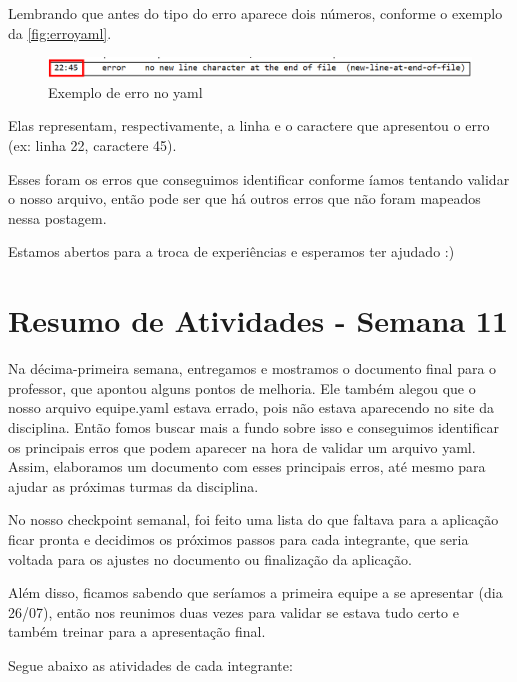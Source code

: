 \begin{apendicesenv}
Lembrando que antes do tipo do erro aparece dois números, conforme o exemplo da \autoref{fig:erroyaml}.

\begin{figure}[htb]
    \centering
	\includegraphics[width=16cm]{imagens/erroyaml.png}
	\caption{\label{fig:erroyaml} Exemplo de erro no yaml}
\end{figure}
\FloatBarrier

Elas representam, respectivamente, a linha e o caractere que apresentou o erro (ex: linha 22, caractere 45).


Esses foram os erros que conseguimos identificar conforme íamos tentando validar o nosso arquivo, então pode ser que há outros erros que não foram mapeados nessa postagem. 

Estamos abertos para a troca de experiências e esperamos ter ajudado :)

\section{Resumo de Atividades - Semana 11}
Na décima-primeira semana, entregamos e mostramos o documento final para o professor, que apontou alguns pontos de melhoria. Ele também alegou que o nosso arquivo equipe.yaml estava errado, pois não estava aparecendo no site da disciplina. Então fomos buscar mais a fundo sobre isso e conseguimos identificar os principais erros que podem aparecer na hora de validar um arquivo yaml. Assim, elaboramos um documento com esses principais erros, até mesmo para ajudar as próximas turmas da disciplina. 

No nosso checkpoint semanal, foi feito uma lista do que faltava para a aplicação ficar pronta e decidimos os próximos passos para cada integrante, que seria voltada para os ajustes no documento ou finalização da aplicação.

Além disso, ficamos sabendo que seríamos a primeira equipe a se apresentar (dia 26/07), então nos reunimos duas vezes para validar se estava tudo certo e também treinar para a apresentação final. 

Segue abaixo as atividades de cada integrante:


\end{apendicesenv}
